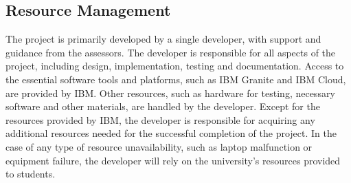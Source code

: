 \documentclass[12pt]{article}
\begin{document}
    \subsection{Resource Management}

    The project is primarily developed by a single developer, with support and guidance from the assessors. The developer is responsible for all aspects of the project, including design, implementation, testing and documentation.
    Access to the essential software tools and platforms, such as IBM Granite and IBM Cloud, are provided by IBM. Other resources, such as hardware for testing, necessary software and other materials, are handled by the developer. Except for the
    resources provided by IBM, the developer is responsible for acquiring any additional resources needed for the successful completion of the project. In the case of any type of resource unavailability, such as laptop malfunction or equipment failure, the
    developer will rely on the university's resources provided to students.
\end{document}

